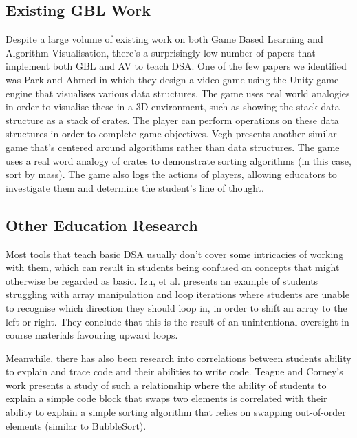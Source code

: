 \documentclass[10pt]{article}
\begin{document}
\subsection{Existing GBL Work}
Despite a large volume of existing work on both Game Based Learning and Algorithm Visualisation, there's a surprisingly low number of papers that implement both GBL and AV to teach DSA. One of the few papers we identified was Park and Ahmed\cite{Park} in which they design a video game using the Unity game engine that visualises various data structures. The game uses real world analogies in order to visualise these in a 3D environment, such as showing the stack data structure as a stack of crates. The player can perform operations on these data structures in order to complete game objectives. Vegh\cite{vegh} presents another similar game that's centered around algorithms rather than data structures. The game uses a real word analogy of crates to demonstrate sorting algorithms (in this case, sort by mass). The game also logs the actions of players, allowing educators to investigate them and determine the student's line of thought.
\subsection{Other Education Research}
Most tools that teach basic DSA usually don't cover some intricacies of working with them, which can result in students being confused on concepts that might otherwise be regarded as basic. Izu, et al.\cite{izuloop} presents an example of students struggling with array manipulation and loop iterations where students are unable to recognise which direction they should loop in, in order to shift an array to the left or right. They conclude that this is the result of an unintentional oversight in course materials favouring upward loops.\par
Meanwhile, there has also been research into correlations between students ability to explain and trace code and their abilities to write code. Teague and Corney's work\cite{Teague:2012:SHW:2483716.2483727} presents a study of such a relationship where the ability of students to explain a simple code block that swaps two elements is correlated with their ability to explain a simple sorting algorithm that relies on swapping out-of-order elements (similar to BubbleSort).
\end{document}
